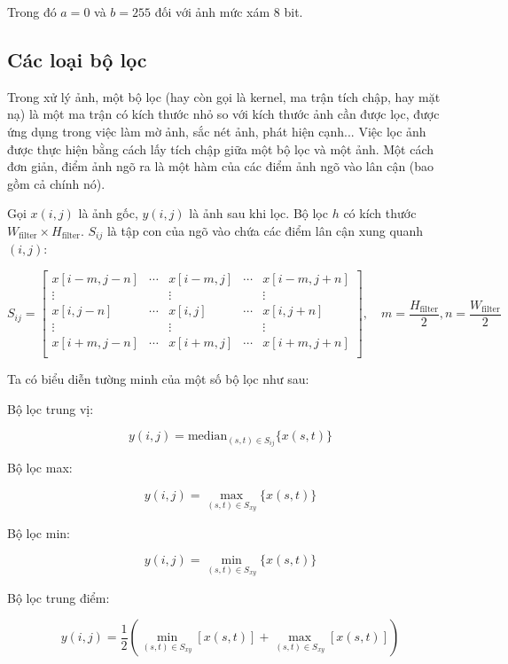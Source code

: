 Trong đó $a = 0$ và $b = 255$ đối với ảnh mức xám 8 bit.




\subsection{Các loại bộ lọc}

Trong xử lý ảnh, một bộ lọc (hay còn gọi là kernel, ma trận tích chập, hay mặt nạ) là một ma trận có kích thước nhỏ so với kích thước ảnh cần được lọc, được ứng dụng trong việc làm mờ ảnh, sắc nét ảnh, phát hiện cạnh... 
Việc lọc ảnh được thực hiện bằng cách lấy tích chập giữa một bộ lọc và một ảnh. 
Một cách đơn giản, điểm ảnh ngõ ra là một hàm của các điểm ảnh ngõ vào lân cận (bao gồm cả chính nó).

Gọi $x(i,j)$ là ảnh gốc, $y(i,j)$ là ảnh sau khi lọc. Bộ lọc $h$ có kích thước $W_\text{filter} \times H_\text{filter}$. $S_{ij}$ là tập con của ngõ vào chứa các điểm lân cận xung quanh $(i,j)$:

$$S_{ij} = \begin{bmatrix}
x[i-m,j-n] & \cdots & x[i-m,j] & \cdots & x[i-m,j+n] \\
\vdots &  & \vdots &  & \vdots \\
x[i,j-n] & \cdots & x[i,j] & \cdots & x[i,j+n] \\
\vdots &  & \vdots &  & \vdots \\
x[i+m,j-n] & \cdots & x[i+m,j] & \cdots & x[i+m,j+n] \\
\end{bmatrix}, \quad m = \frac{H_\text{filter}}{2}, n = \frac{W_\text{filter}}{2}$$

Ta có biểu diễn tường minh của một số bộ lọc như sau:

Bộ lọc trung vị:

$$y(i,j) = \text{median}_{(s,t) \in S_{ij}}{\{x(s,t)\}}$$

Bộ lọc max:

$$y(i,j) = \max_{(s,t) \in S_{xy}}{\{x(s,t)\}}$$

Bộ lọc min:

$$y(i,j) = \min_{(s,t) \in S_{xy}}{\{x(s,t)\}}$$

Bộ lọc trung điểm:

$$y(i,j) = \frac{1}{2} \left ( \min_{(s,t) \in S_{xy}}[x(s,t)] + \max_{(s,t) \in S_{xy}}[x(s,t)]\right )$$